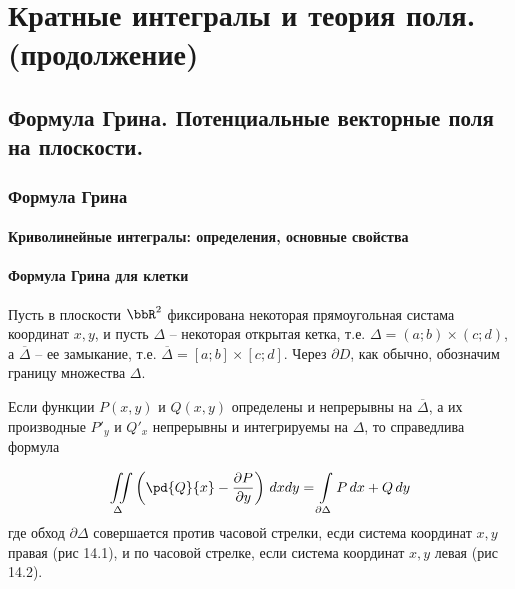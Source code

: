 \part[Кратные интегралы и теория поля.(продолжение)]{Кратные интегралы и теория поля.\protect\linebreak(продолжение)}

\chapter{Формула Грина. Потенциальные векторные поля на плоскости.}
\section{Формула Грина} 

\subsection{Криволинейные интегралы: определения, основные свойства}

\subsection{Формула Грина для клетки}

Пусть в плоскости $\bbR^2$ фиксирована некоторая прямоугольная систама координат $x,y$, и пусть $\Delta$ -- некоторая открытая кетка, т.е. $\Delta = (a;b)\times(c;d)$, а $\overline{\Delta}$ -- ее замыкание, т.е. $\overline{\Delta}=[a;b]\times[c;d]$. Через $\partial D$, как обычно, обозначим границу множества $\Delta$.


\begin{lemm}
Если функции $P(x,y)$ и $Q(x,y)$ определены и непрерывны на $\overline{\Delta}$, а их производные $P'_y$ и $Q'_x$ непрерывны и интегрируемы на $\Delta$, то справедлива формула

\begin{equation} \label{Grin}
\iint\limits_{\Delta} \left( \pd{Q}{x}-\frac{\partial P}{\partial y} \right)\,dxdy = \int\limits_{\partial \Delta} P\,dx + Q\,dy
\end{equation}
где обход $\partial\Delta$ совершается против часовой стрелки, есди система координат $x,y$ правая (рис 14.1), и по часовой стрелке, если система координат $x,y$ левая (рис 14.2).
\end{lemm}

